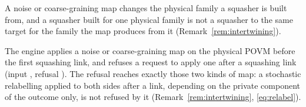 
A noise or coarse-graining map changes the physical family a squasher is
built from, and a squasher built for one physical family is not a squasher
to the same target for the family the map produces from it
(Remark~\ref{rem:intertwining}).

\begin{requirement}\label{req:post-processing-order}
The engine applies a noise or coarse-graining map on the physical POVM
before the first squashing link, and refuses a request to apply one after a
squashing link (input , refusal
). The refusal reaches exactly those
two kinds of map: a stochastic relabelling applied to both sides after a
link, depending on the private component of the outcome only, is not
refused by it (Remark~\ref{rem:intertwining}, \eqref{eq:relabel}).
\end{requirement}
